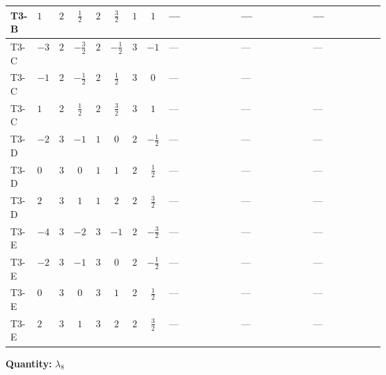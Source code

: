 \documentclass[8pt]{article}
\begin{document}
\begin{landscape}
\begin{longtable}{@{}llcccccc >{\raggedright\arraybackslash}p{0.21\linewidth} >{\raggedright\arraybackslash}p{0.21\linewidth} >{\raggedright\arraybackslash}p{0.21\linewidth}@{}}
\midrule
T3-B & $1$ & $2$ & $\frac{1}{2}$ & $2$ & $\frac{3}{2}$ & $1$ & $1$ & --- & --- & --- \\
\midrule
T3-C & $-3$ & $2$ & $-\frac{3}{2}$ & $2$ & $-\frac{1}{2}$ & $3$ & $-1$ & --- & --- & --- \\
\midrule
T3-C & $-1$ & $2$ & $-\frac{1}{2}$ & $2$ & $\frac{1}{2}$ & $3$ & $0$ & --- & --- & \scriptsize\adjustbox{max width=\linewidth}{$\begin{gathered} +4 {\lambda_{7}} \left({\lambda_{9}}\right)^{*}\end{gathered}$} \\
\midrule
T3-C & $1$ & $2$ & $\frac{1}{2}$ & $2$ & $\frac{3}{2}$ & $3$ & $1$ & --- & --- & --- \\
\midrule
T3-D & $-2$ & $3$ & $-1$ & $1$ & $0$ & $2$ & $-\frac{1}{2}$ & --- & --- & --- \\
\midrule
T3-D & $0$ & $3$ & $0$ & $1$ & $1$ & $2$ & $\frac{1}{2}$ & --- & --- & --- \\
\midrule
T3-D & $2$ & $3$ & $1$ & $1$ & $2$ & $2$ & $\frac{3}{2}$ & --- & --- & --- \\
\midrule
T3-E & $-4$ & $3$ & $-2$ & $3$ & $-1$ & $2$ & $-\frac{3}{2}$ & --- & --- & --- \\
\midrule
T3-E & $-2$ & $3$ & $-1$ & $3$ & $0$ & $2$ & $-\frac{1}{2}$ & --- & --- & --- \\
\midrule
T3-E & $0$ & $3$ & $0$ & $3$ & $1$ & $2$ & $\frac{1}{2}$ & --- & --- & --- \\
\midrule
T3-E & $2$ & $3$ & $1$ & $3$ & $2$ & $2$ & $\frac{3}{2}$ & --- & --- & --- \\
\midrule
\bottomrule
\end{longtable}
\clearpage
\noindent\textbf{Quantity: }$\lambda_{8}$\par\smallskip

\end{landscape}
\end{document}
